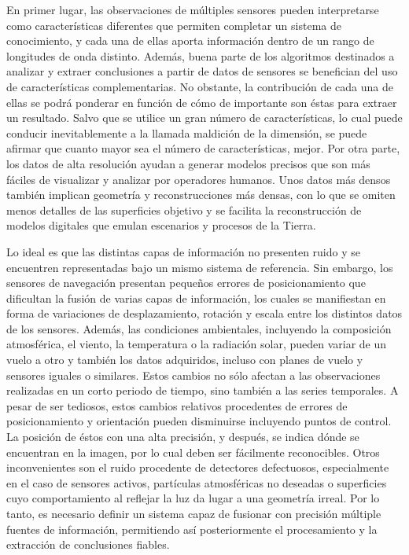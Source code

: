 En primer lugar, las observaciones de múltiples sensores pueden interpretarse como características diferentes que permiten completar un sistema de conocimiento, y cada una de ellas aporta información dentro de un rango de longitudes de onda distinto. Además, buena parte de los algoritmos destinados a analizar y extraer conclusiones a partir de datos de sensores se benefician del uso de características complementarias. No obstante, la contribución de cada una de ellas se podrá ponderar en función de cómo de importante son éstas para extraer un resultado. Salvo que se utilice un gran número de características, lo cual puede conducir inevitablemente a la llamada maldición de la dimensión, se puede afirmar que cuanto mayor sea el número de características, mejor. Por otra parte, los datos de alta resolución ayudan a generar modelos precisos que son más fáciles de visualizar y analizar por operadores humanos. Unos datos más densos también implican geometría y reconstrucciones más densas, con lo que se omiten menos detalles de las superficies objetivo y se facilita la reconstrucción de modelos digitales que emulan escenarios y procesos de la Tierra. 

Lo ideal es que las distintas capas de información no presenten ruido y se encuentren representadas bajo un mismo sistema de referencia. Sin embargo, los sensores de navegación presentan pequeños errores de posicionamiento que dificultan la fusión de varias capas de información, los cuales se manifiestan en forma de variaciones de desplazamiento, rotación y escala entre los distintos datos de los sensores. Además, las condiciones ambientales, incluyendo la composición atmosférica, el viento, la temperatura o la radiación solar, pueden variar de un vuelo a otro y también los datos adquiridos, incluso con planes de vuelo y sensores iguales o similares. Estos cambios no sólo afectan a las observaciones realizadas en un corto periodo de tiempo, sino también a las series temporales. A pesar de ser tediosos, estos cambios relativos procedentes de errores de posicionamiento y orientación pueden disminuirse incluyendo puntos de control. La posición de éstos con una alta precisión, y después, se indica dónde se encuentran en la imagen, por lo cual deben ser fácilmente reconocibles. Otros inconvenientes son el ruido procedente de detectores defectuosos, especialmente en el caso de sensores activos, partículas atmosféricas no deseadas o superficies cuyo comportamiento al reflejar la luz da lugar a una geometría irreal. Por lo tanto, es necesario definir un sistema capaz de fusionar con precisión múltiple fuentes de información, permitiendo así posteriormente el procesamiento y la extracción de conclusiones fiables. 

